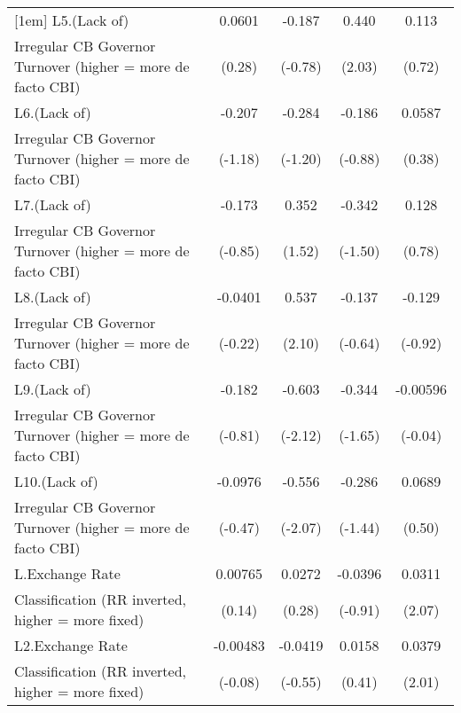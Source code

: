 {\begin{tabular}{l*{4}{c}}
[1em]
L5.(Lack of)        &      0.0601         &      -0.187         &       0.440\sym{*}  &       0.113         \\
Irregular CB Governor Turnover (higher = more de facto CBI)&      (0.28)         &     (-0.78)         &      (2.03)         &      (0.72)         \\
[1em]
L6.(Lack of)        &      -0.207         &      -0.284         &      -0.186         &      0.0587         \\
Irregular CB Governor Turnover (higher = more de facto CBI)&     (-1.18)         &     (-1.20)         &     (-0.88)         &      (0.38)         \\
[1em]
L7.(Lack of)        &      -0.173         &       0.352         &      -0.342         &       0.128         \\
Irregular CB Governor Turnover (higher = more de facto CBI)&     (-0.85)         &      (1.52)         &     (-1.50)         &      (0.78)         \\
[1em]
L8.(Lack of)        &     -0.0401         &       0.537\sym{*}  &      -0.137         &      -0.129         \\
Irregular CB Governor Turnover (higher = more de facto CBI)&     (-0.22)         &      (2.10)         &     (-0.64)         &     (-0.92)         \\
[1em]
L9.(Lack of)        &      -0.182         &      -0.603\sym{*}  &      -0.344         &    -0.00596         \\
Irregular CB Governor Turnover (higher = more de facto CBI)&     (-0.81)         &     (-2.12)         &     (-1.65)         &     (-0.04)         \\
[1em]
L10.(Lack of)       &     -0.0976         &      -0.556\sym{*}  &      -0.286         &      0.0689         \\
Irregular CB Governor Turnover (higher = more de facto CBI)&     (-0.47)         &     (-2.07)         &     (-1.44)         &      (0.50)         \\
[1em]
L.Exchange Rate     &     0.00765         &      0.0272         &     -0.0396         &      0.0311\sym{*}  \\
Classification (RR inverted, higher = more fixed)&      (0.14)         &      (0.28)         &     (-0.91)         &      (2.07)         \\
[1em]
L2.Exchange Rate    &    -0.00483         &     -0.0419         &      0.0158         &      0.0379\sym{*}  \\
Classification (RR inverted, higher = more fixed)&     (-0.08)         &     (-0.55)         &      (0.41)         &      (2.01)         \\

\end{tabular}}
